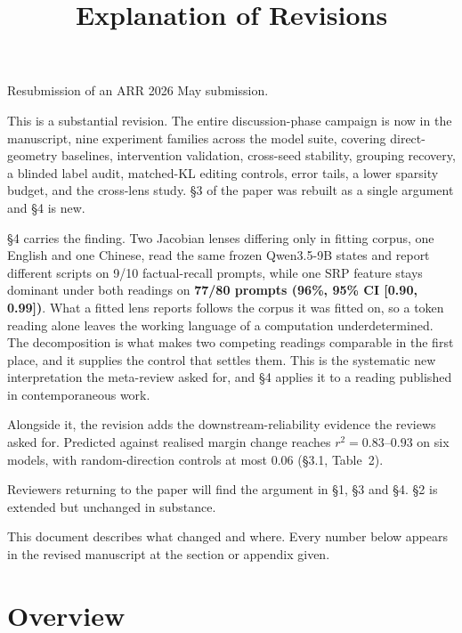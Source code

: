 \documentclass[11pt]{article}
\title{\vspace{-2.5em}\textbf{Explanation of Revisions}\vspace{-0.8em}}
\date{}
\newif\ifdraftnotes
\newcommand{\note}[1]{%
  \ifdraftnotes\par\smallskip{\color{red}\small\textbf{[}#1\textbf{]}}\par\smallskip\fi}
\begin{document}
\maketitle

Resubmission of an ARR 2026 May submission.

This is a substantial revision. The entire discussion-phase campaign is now
in the manuscript, nine experiment families across the model suite, covering
direct-geometry baselines, intervention validation, cross-seed stability,
grouping recovery, a blinded label audit, matched-KL editing controls, error
tails, a lower sparsity budget, and the cross-lens study. \S3 of the paper
was rebuilt as a single argument and \S4 is new.

\S4 carries the finding. Two Jacobian lenses differing only in fitting
corpus, one English and one Chinese, read the same frozen Qwen3.5-9B states
and report different scripts on 9/10 factual-recall prompts, while one SRP
feature stays dominant under both readings on \textbf{77/80 prompts (96\%,
95\% CI [0.90, 0.99])}. What a fitted lens reports follows the corpus it
was fitted on, so a token reading alone leaves the working language of a
computation underdetermined. The decomposition is what makes two competing
readings comparable in the first place, and it supplies the control that
settles them. This is the systematic new interpretation the meta-review
asked for, and \S4 applies it to a reading published in contemporaneous work.

Alongside it, the revision adds the downstream-reliability evidence the
reviews asked for.
Predicted against realised margin change reaches $r^2=0.83$--$0.93$ on six
models, with random-direction controls at most 0.06 (\S3.1, Table~2).

Reviewers returning to the paper will find the argument in \S1, \S3 and \S4.
\S2 is extended but unchanged in substance.

This document describes what changed and where. Every number below appears in
the revised manuscript at the section or appendix given.

\note{DRAFT BUILD. Set \texttt{\textbackslash draftnotesfalse} and strip
every red note before converting the posting PDF.}

\section{Overview}
\end{document}
